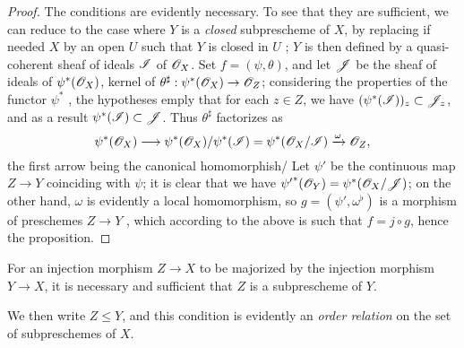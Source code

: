 \begin{proof}
\label{proof-1.4.1.9}
The conditions are evidently necessary. To see that they are sufficient, we can reduce to the case
where $Y$ is a {\em closed} subprescheme of $X$, by replacing if needed $X$ by an open $U$ such that
$Y$ is closed in $U$ ; $Y$ is then defined by a quasi-coherent sheaf of
ideals $\mathscr{I}$ of $\mathscr{O}_X$. Set $f=(\psi,\theta)$, and let $\mathscr{J}$ be the sheaf of ideals of
$\psi^*(\mathscr{O}_X)$, kernel of $\theta^\sharp:\psi^*(\mathscr{O}_X)\to\mathscr{O}_Z$; considering the properties of the
functor $\psi^*$ , the hypotheses emply that for each $z\in Z$,
we have $(\psi^*(\mathscr{I}))_z\subset\mathscr{J}_z$, and as a result $\psi^*(\mathscr{I})\subset\mathscr{J}$. Thus
$\theta^\sharp$ factorizes as
\[
  \psi^*(\mathscr{O}_X)\longrightarrow\psi^*(\mathscr{O}_X)/\psi^*(\mathscr{I})=\psi^*(\mathscr{O}_X/\mathscr{I})\xrightarrow{\omega}\mathscr{O}_Z,
\]
the first arrow being the canonical homomorphish/ Let $\psi'$ be the continuous map $Z\to Y$
coinciding with $\psi$; it is clear that we have ${\psi'}^*(\mathscr{O}_Y)=\psi^*(\mathscr{O}_X/\mathscr{J})$; on the other
hand, $\omega$ is evidently a local homomorphism, so $g=(\psi',\omega^\flat)$ is a morphism
of preschemes $Z\to Y$ , which according to the above is such that
$f=j\circ g$, hence the proposition.
\end{proof}

\begin{cor}[4.1.10]
\label{1.4.1.10}
For an injection morphism $Z\to X$ to be majorized by the injection morphism $Y\to X$, it is
necessary and sufficient that $Z$ is a subprescheme of $Y$.
\end{cor}

We then write $Z\leqslant Y$, and this condition is evidently an {\em order relation} on the
set of subpreschemes of $X$.


